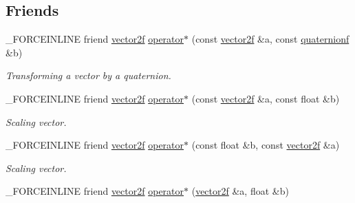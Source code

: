 \subsection*{Friends}
\begin{DoxyCompactItemize}
\item 
\hypertarget{classbt_1_1vector2f_a7fcd4ba4af68dd2041a649233f5a5d19}{\-\_\-\-F\-O\-R\-C\-E\-I\-N\-L\-I\-N\-E friend \hyperlink{classbt_1_1vector2f}{vector2f} \hyperlink{classbt_1_1vector2f_a7fcd4ba4af68dd2041a649233f5a5d19}{operator$\ast$} (const \hyperlink{classbt_1_1vector2f}{vector2f} \&a, const \hyperlink{classbt_1_1quaternionf}{quaternionf} \&b)}\label{classbt_1_1vector2f_a7fcd4ba4af68dd2041a649233f5a5d19}

\begin{DoxyCompactList}\small\item\em Transforming a vector by a quaternion. \end{DoxyCompactList}\item 
\hypertarget{classbt_1_1vector2f_a4ed6864c4bc96a55653b157243f3539a}{\-\_\-\-F\-O\-R\-C\-E\-I\-N\-L\-I\-N\-E friend \hyperlink{classbt_1_1vector2f}{vector2f} \hyperlink{classbt_1_1vector2f_a4ed6864c4bc96a55653b157243f3539a}{operator$\ast$} (const \hyperlink{classbt_1_1vector2f}{vector2f} \&a, const float \&b)}\label{classbt_1_1vector2f_a4ed6864c4bc96a55653b157243f3539a}

\begin{DoxyCompactList}\small\item\em Scaling vector. \end{DoxyCompactList}\item 
\hypertarget{classbt_1_1vector2f_a3c97a7a6d864ff3f1f735cb9dc498095}{\-\_\-\-F\-O\-R\-C\-E\-I\-N\-L\-I\-N\-E friend \hyperlink{classbt_1_1vector2f}{vector2f} \hyperlink{classbt_1_1vector2f_a3c97a7a6d864ff3f1f735cb9dc498095}{operator$\ast$} (const float \&b, const \hyperlink{classbt_1_1vector2f}{vector2f} \&a)}\label{classbt_1_1vector2f_a3c97a7a6d864ff3f1f735cb9dc498095}

\begin{DoxyCompactList}\small\item\em Scaling vector. \end{DoxyCompactList}\item 
\hypertarget{classbt_1_1vector2f_a494e9c72e5405aba2fc87566b02949b6}{\-\_\-\-F\-O\-R\-C\-E\-I\-N\-L\-I\-N\-E friend \hyperlink{classbt_1_1vector2f}{vector2f} \hyperlink{classbt_1_1vector2f_a494e9c72e5405aba2fc87566b02949b6}{operator$\ast$} (\hyperlink{classbt_1_1vector2f}{vector2f} \&a, float \&b)}\label{classbt_1_1vector2f_a494e9c72e5405aba2fc87566b02949b6}


\end{DoxyCompactItemize}
